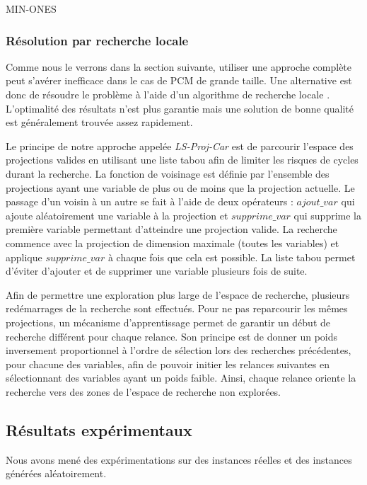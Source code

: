 \documentclass[a4paper,10pt]{article}
\begin{document}
MIN-ONES
\subsubsection{Résolution par recherche locale}
Comme nous le verrons dans la section suivante, utiliser une approche complète peut s'avérer inefficace dans le cas de PCM de grande taille. Une alternative est donc de résoudre le problème à l'aide d'un algorithme de recherche locale \cite{Hoos2004}. L'optimalité des résultats n'est plus garantie mais une solution de bonne qualité est généralement trouvée assez rapidement.

Le principe de notre approche appelée \emph{LS-Proj-Car} est de parcourir l'espace des projections valides en utilisant une liste tabou \cite{Glover1997} afin de limiter les risques de cycles durant la recherche. La fonction de voisinage est définie par l'ensemble des projections ayant une variable de plus ou de moins que la projection actuelle. Le passage d'un voisin à un autre se fait à l'aide de deux opérateurs : $ajout\_var$ qui ajoute aléatoirement une variable à la projection et $supprime\_var$ qui supprime la première variable permettant d'atteindre une projection valide. La recherche commence avec la projection de dimension maximale (toutes les variables) et applique $supprime\_var$ à chaque fois que cela est possible. La liste tabou permet d'éviter d'ajouter et de supprimer une variable plusieurs fois de suite.

Afin de permettre une exploration plus large de l'espace de recherche, plusieurs redémarrages de la recherche sont effectués. Pour ne pas reparcourir les mêmes projections, un mécanisme d'apprentissage permet de garantir un début de recherche différent pour chaque relance. Son principe est de donner un poids inversement proportionnel à l'ordre de sélection lors des recherches précédentes, pour chacune des variables, afin de pouvoir initier les relances suivantes en sélectionnant des variables ayant un poids faible. Ainsi, chaque relance oriente la recherche vers des zones de l'espace de recherche non explorées.
\subsection{Résultats expérimentaux}


Nous avons mené des expérimentations sur des instances réelles et des instances générées aléatoirement.
\end{document}
